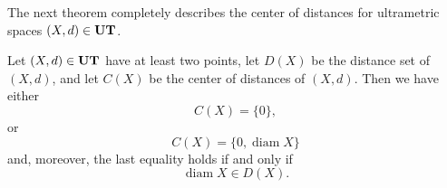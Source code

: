 \documentclass{article}
\begin{document}
The next theorem completely describes the center of distances for ultrametric spaces $(X,d)\in{\bf UT}$.

\begin{Theorem}\label{dggkq}
Let $(X,d) \in {\bf UT}$ have at least two points, let $D(X)$ be the distance set of $(X,d)$, and let $C(X)$ be the center of distances of $(X,d)$.
Then
 we have either
\begin{equation}\label{jy1}
    C(X)=\{0\},
\end{equation}
or
\begin{equation}\label{jy2}
    C(X)=\{0,\operatorname{diam}X\}
\end{equation}
and, moreover, the last equality holds if and only if 
\begin{equation}
    \label{er0}
\operatorname{diam} X \in D(X).
\end{equation}




\end{Theorem}
\end{document}
